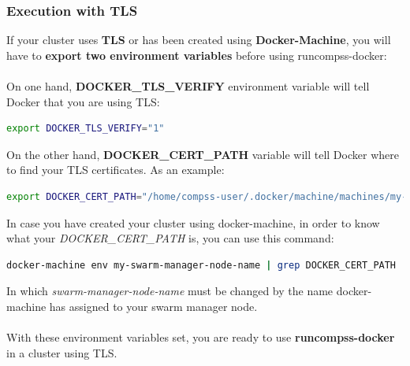 \subsubsection{Execution with TLS}
If your cluster uses \textbf{TLS} or has been created using \textbf{Docker-Machine}, you will have to 
\textbf{export two environment variables} before using runcompss-docker:\\ \\
On one hand, \textbf{DOCKER\_TLS\_VERIFY} environment variable will tell Docker that you are using TLS:
\begin{lstlisting}[language=bash]
export DOCKER_TLS_VERIFY="1"
\end{lstlisting}
On the other hand, \textbf{DOCKER\_CERT\_PATH} variable will tell Docker where to find your TLS certificates. As an example:
\begin{lstlisting}[language=bash]
export DOCKER_CERT_PATH="/home/compss-user/.docker/machine/machines/my-manager-node"
\end{lstlisting}

In case you have created your cluster using docker-machine, in order to know what
your \textit{DOCKER\_CERT\_PATH} is, you can use this command:
\begin{lstlisting}[language=bash]
docker-machine env my-swarm-manager-node-name | grep DOCKER_CERT_PATH
\end{lstlisting}
In which \textit{swarm-manager-node-name} must be changed by the name docker-machine has assigned to your swarm manager node.\\ \\
With these environment variables set, you are ready to use \textbf{runcompss-docker} in a cluster using TLS.

\clearpage

